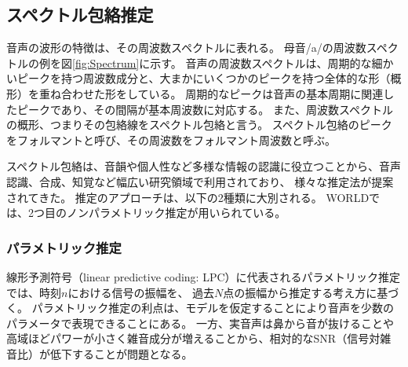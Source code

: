 \subsection{スペクトル包絡推定}

音声の波形の特徴は、その周波数スペクトルに表れる。
母音/a/の周波数スペクトルの例を図\ref{fig:Spectrum}に示す。
音声の周波数スペクトルは、周期的な細かいピークを持つ周波数成分と、大まかにいくつかのピークを持つ全体的な形（概形）を重ね合わせた形をしている。
周期的なピークは音声の基本周期に関連したピークであり、その間隔が基本周波数に対応する。
また、周波数スペクトルの概形、つまりその包絡線をスペクトル包絡と言う。
スペクトル包絡のピークをフォルマントと呼び、その周波数をフォルマント周波数と呼ぶ。

スペクトル包絡は、音韻や個人性など多様な情報の認識に役立つことから、音声認識、合成、知覚など幅広い研究領域で利用されており、
様々な推定法が提案されてきた。
推定のアプローチは、以下の2種類に大別される。
WORLDでは、2つ目のノンパラメトリック推定が用いられている。

\subsubsection{パラメトリック推定}
線形予測符号（linear predictive coding: LPC）に代表されるパラメトリック推定では、時刻$n$における信号の振幅を、
過去$N$点の振幅から推定する考え方に基づく。
パラメトリック推定の利点は、モデルを仮定することにより音声を少数のパラメータで表現できることにある。
一方、実音声は鼻から音が抜けることや高域ほどパワーが小さく雑音成分が増えることから、相対的なSNR（信号対雑音比）が低下することが問題となる。



